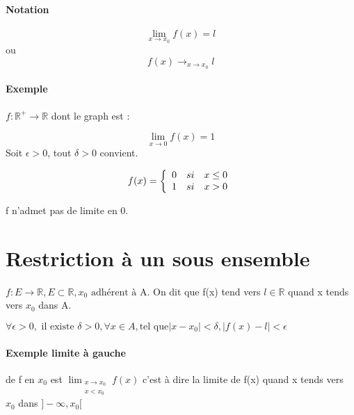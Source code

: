 \paragraph{Notation} \[\lim_{x \to x_0} f(x) = l\] ou \[f(x) \rightarrow_{x \to x_0} l\]
\paragraph{Exemple} $ f:\mathbb{R}^+ \rightarrow \mathbb{R}$ dont le graph est :


\[ \lim_{x \to 0} f(x) = 1\] Soit $\epsilon > 0$, tout $\delta > 0$ convient.


\[f(x) = 
\left\{
\begin{array}{r c l}
	0 & si & x \leq 0 \\
	1 & si & x > 0
\end{array}
\right.
\]

f n'admet pas de limite en 0.

\section{Restriction à un sous ensemble}
$f : E \rightarrow \mathbb{R}, E \subset \mathbb{R}, x_0 \text{ adhérent à A.}$
On dit que f(x) tend vers $l \in \mathbb{R}$ quand x tends vers $x_0$ dans A.

$\forall \epsilon > 0, \text{ il existe } \delta > 0, \forall x \in A, \text{tel que} |x-x_0| < \delta, |f(x) - l| < \epsilon$

\paragraph{Exemple limite à gauche} de f en $x_0$ est $\lim_{\substack {x \to x_0 \\ x < x_0}} f(x)$ c'est à dire la limite de f(x) quand x tends vers $x_0$ dans $]-\infty, x_0[$
